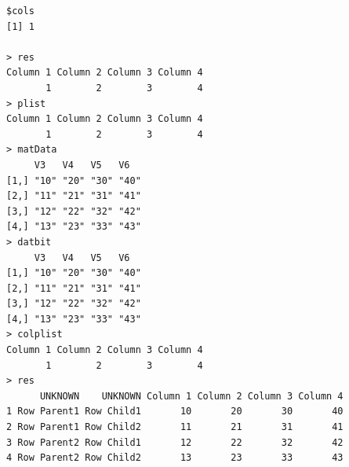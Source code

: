 \documentclass[a4paper]{article}
\begin{document}
\begin{verbatim}
$cols
[1] 1

> res 
Column 1 Column 2 Column 3 Column 4 
       1        2        3        4 
> plist 
Column 1 Column 2 Column 3 Column 4 
       1        2        3        4 
> matData 
     V3   V4   V5   V6  
[1,] "10" "20" "30" "40"
[2,] "11" "21" "31" "41"
[3,] "12" "22" "32" "42"
[4,] "13" "23" "33" "43"
> datbit 
     V3   V4   V5   V6  
[1,] "10" "20" "30" "40"
[2,] "11" "21" "31" "41"
[3,] "12" "22" "32" "42"
[4,] "13" "23" "33" "43"
> colplist 
Column 1 Column 2 Column 3 Column 4 
       1        2        3        4 
> res 
      UNKNOWN    UNKNOWN Column 1 Column 2 Column 3 Column 4
1 Row Parent1 Row Child1       10       20       30       40
2 Row Parent1 Row Child2       11       21       31       41
3 Row Parent2 Row Child1       12       22       32       42
4 Row Parent2 Row Child2       13       23       33       43
\end{verbatim}

\newpage
\end{document}
